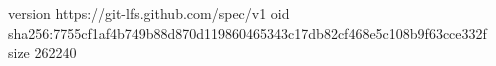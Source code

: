 version https://git-lfs.github.com/spec/v1
oid sha256:7755cf1af4b749b88d870d119860465343c17db82cf468e5c108b9f63cce332f
size 262240

